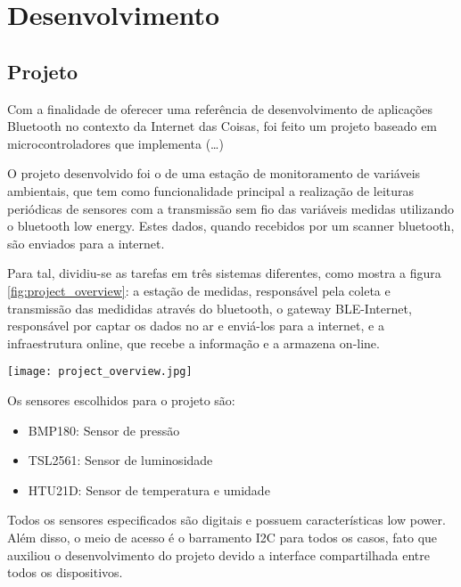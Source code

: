 \section{Desenvolvimento}

\subsection{Projeto}
Com a finalidade de oferecer uma referência de desenvolvimento de aplicações
Bluetooth no contexto da Internet das Coisas, foi feito um projeto baseado em
microcontroladores que implementa (\ldots) %

O projeto desenvolvido foi o de uma estação de monitoramento de variáveis
ambientais, que tem como funcionalidade principal a realização de leituras
periódicas de sensores com a transmissão sem fio das variáveis medidas
utilizando o bluetooth low energy. Estes dados, quando recebidos por um scanner
bluetooth, são enviados para a internet.

Para tal, dividiu-se as tarefas em três sistemas diferentes, como mostra a
figura \ref{fig:project_overview}:
a estação de medidas, responsável pela coleta e transmissão das medididas através do
bluetooth, o gateway BLE-Internet, responsável por captar os dados no ar e
enviá-los para a internet, e a infraestrutura online, que recebe a informação e
a armazena on-line.

\begin{center}
	\centering 
	\texttt{[image: project\_overview.jpg]}
	\label{fig:project_overview}
\end{center} 


Os sensores escolhidos para o projeto são:
\begin{itemize}
  \item BMP180: Sensor de pressão
  \item TSL2561: Sensor de luminosidade
  \item HTU21D: Sensor de temperatura e umidade
\end{itemize}

Todos os sensores especificados são digitais e possuem características low
power. Além disso, o meio de acesso é o barramento I2C para todos os casos, fato
que auxiliou o desenvolvimento do projeto devido a interface compartilhada entre
todos os dispositivos.

